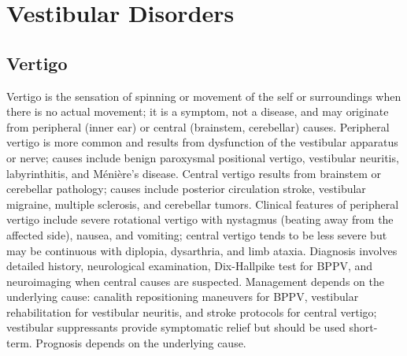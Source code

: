 \section{Vestibular Disorders}








\label{sec:Vestibular Disorders}

\subsection{Vertigo}
\label{sec:Vertigo}
Vertigo is the sensation of spinning or movement of the self or surroundings when there is no actual movement; it is a symptom, not a disease, and may originate from peripheral (inner ear) or central (brainstem, cerebellar) causes. Peripheral vertigo is more common and results from dysfunction of the vestibular apparatus or nerve; causes include benign paroxysmal positional vertigo, vestibular neuritis, labyrinthitis, and M\'{e}ni\`{e}re's disease. Central vertigo results from brainstem or cerebellar pathology; causes include posterior circulation stroke, vestibular migraine, multiple sclerosis, and cerebellar tumors. Clinical features of peripheral vertigo include severe rotational vertigo with nystagmus (beating away from the affected side), nausea, and vomiting; central vertigo tends to be less severe but may be continuous with diplopia, dysarthria, and limb ataxia. Diagnosis involves detailed history, neurological examination, Dix-Hallpike test for BPPV, and neuroimaging when central causes are suspected. Management depends on the underlying cause: canalith repositioning maneuvers for BPPV, vestibular rehabilitation for vestibular neuritis, and stroke protocols for central vertigo; vestibular suppressants provide symptomatic relief but should be used short-term. Prognosis depends on the underlying cause.

